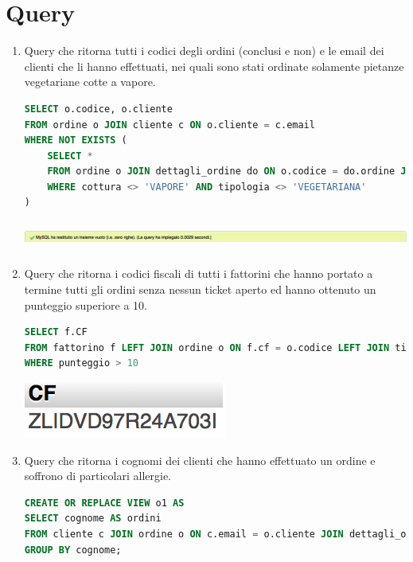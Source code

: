 \documentclass[10pt]{article}
\begin{document}
	\section{Query}
	\begin{enumerate}[noitemsep]
		\item Query che ritorna tutti i codici degli ordini (conclusi e non) e le email dei clienti che li hanno effettuati, nei quali sono stati ordinate solamente pietanze vegetariane cotte a vapore.
\begin{lstlisting}[language=sql]
SELECT o.codice, o.cliente
FROM ordine o JOIN cliente c ON o.cliente = c.email
WHERE NOT EXISTS (
	SELECT *
	FROM ordine o JOIN dettagli_ordine do ON o.codice = do.ordine JOIN pietanza p ON do.pietanza = p.codice
	WHERE cottura <> 'VAPORE' AND tipologia <> 'VEGETARIANA'
)
\end{lstlisting}
\begin{center}
\hspace*{-1cm}
\includegraphics[width=19cm, height=1cm]{query1.png}
\hspace*{-1cm}
\end{center}
	\item Query che ritorna i codici fiscali di tutti i fattorini che hanno portato a termine tutti gli ordini senza nessun ticket aperto ed hanno ottenuto un punteggio superiore a 10.
\begin{lstlisting}[language=sql]
SELECT f.CF 
FROM fattorino f LEFT JOIN ordine o ON f.cf = o.codice LEFT JOIN ticket t ON o.codice = t.ordine 
WHERE punteggio > 10
\end{lstlisting}	
\begin{center}
\hspace*{-1cm}
\includegraphics[scale=0.9]{query2.png}
\hspace*{-1cm}
\end{center}
	\item Query che ritorna i cognomi dei clienti che hanno effettuato un ordine e soffrono di particolari allergie.
	\begin{lstlisting}[language=sql]
CREATE OR REPLACE VIEW o1 AS
SELECT cognome AS ordini
FROM cliente c JOIN ordine o ON c.email = o.cliente JOIN dettagli_ordine as do ON o.codice = do.ordine
GROUP BY cognome;


\end{lstlisting}
\end{enumerate}
\end{document}
